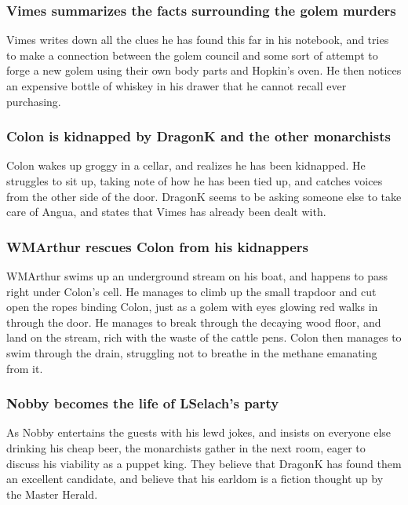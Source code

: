 \subsubsection{\Gls{Vimes} summarizes the facts surrounding the golem murders}
\Gls{Vimes} writes down all the clues he has found this far in his notebook, and tries to make a
connection between the golem council and some sort of attempt to forge a new golem using their own
body parts and \Gls{Hopkin}'s oven. He then notices an expensive bottle of whiskey in his drawer
that he cannot recall ever purchasing.

\subsubsection{\Gls{Colon} is kidnapped by \Gls{DragonK} and the other monarchists}
\Gls{Colon} wakes up groggy in a cellar, and realizes he has been kidnapped. He struggles to sit up,
taking note of how he has been tied up, and catches voices from the other side of the door.
\Gls{DragonK} seems to be asking someone else to take care of \Gls{Angua}, and states that
\Gls{Vimes} has already been dealt with.

\subsubsection{\Gls{WMArthur} rescues \Gls{Colon} from his kidnappers}
\Gls{WMArthur} swims up an underground stream on his boat, and happens to pass right under
\Gls{Colon}'s cell. He manages to climb up the small trapdoor and cut open the ropes binding
\Gls{Colon}, just as a golem with eyes glowing red walks in through the door. He manages to break
through the decaying wood floor, and land on the stream, rich with the waste of the cattle pens.
\Gls{Colon} then manages to swim through the drain, struggling not to breathe in the methane
emanating from it.

\subsubsection{\Gls{Nobby} becomes the life of \Gls{LSelach}'s party}
As \Gls{Nobby} entertains the guests with his lewd jokes, and insists on everyone else drinking his
cheap beer, the monarchists gather in the next room, eager to discuss his viability as a puppet
king. They believe that \Gls{DragonK} has found them an excellent candidate, and believe that his
earldom is a fiction thought up by the Master Herald.

